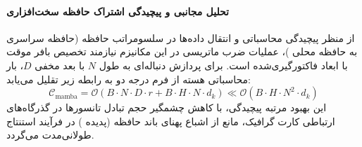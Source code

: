 \paragraph{تحلیل مجانبی و پیچیدگی اشتراک حافظه سخت‌افزاری}
از منظر پیچیدگی محاسباتی و انتقال داده‌ها در سلسومراتب حافظه (حافظه سراسری  به حافظه محلی )، عملیات ضرب ماتریسی در این مکانیزم نیازمند تخصیص بافر موقت با ابعاد فاکتورگیری‌شده است. برای پردازش دنباله‌ای به طول $N$ با بعد مخفی $D$، بار محاسباتی هسته از فرم درجه دو به رابطه زیر تقلیل می‌یابد:
\begin{equation}
\label{eq:complexity_mamba}
\mathcal{C}_{\text{mamba}} = \mathcal{O}\left( B \cdot N \cdot D \cdot r + B \cdot H \cdot N \cdot d_k \right) \ll \mathcal{O}\left( B \cdot H \cdot N^2 \cdot d_k \right)
\end{equation}
این بهبود مرتبه پیچیدگی، با کاهش چشمگیر حجم تبادل تانسورها در گذرگاه‌های ارتباطی کارت گرافیک، مانع از اشباع پهنای باند حافظه (پدیده ) در فرآیند استنتاج طولانی‌مدت می‌گردد.